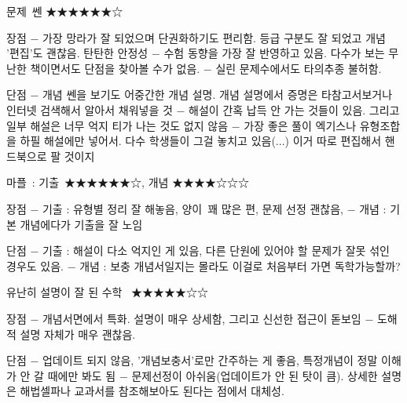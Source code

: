 문제 쎈 ★★★★★★☆
\vspace{5mm}

장점
$-$ 가장 망라가 잘 되었으며 단권화하기도 편리함. 등급 구분도 잘 되었고 개념 '편집'도 괜찮음. 탄탄한 안정성
$-$ 수험 동향을 가장 잘 반영하고 있음. 다수가 보는 무난한 책이면서도 단점을 찾아볼 수가 없음.
$-$ 실린 문제수에서도 타의추종 불허함.
\vspace{5mm}

단점
$-$ 개념 쎈을 보기도 어중간한 개념 설명. 개념 설명에서 증명은 타참고서보거나 인터넷 검색해서 알아서 채워넣을 것
$-$ 해설이 간혹 납득 안 가는 것들이 있음. 그리고 일부 해설은 너무 억지 티가 나는 것도 없지 않음
$-$ 가장 좋은 풀이 엑기스나 유형조합을 하필 해설에만 넣어서. 다수 학생들이 그걸 놓치고 있음(...) 이거 따로 편집해서 핸드북으로 팔 것이지
\vspace{5mm}

마플 : 기출 ★★★★★★☆, 개념 ★★★★☆☆☆
\vspace{5mm}

장점
$-$ 기출 : 유형별 정리 잘 해놓음, 양이 꽤 많은 편, 문제 선정 괜찮음,
$-$ 개념 : 기본 개념에다가 기출을 잘 노임
\vspace{5mm}

단점
$-$ 기출 : 해설이 다소 억지인 게 있음, 다른 단원에 있어야 할 문제가 잘못 섞인 경우도 있음.
$-$ 개념 : 보충 개념서일지는 몰라도 이걸로 처음부터 가면 독학가능할까?
\vspace{5mm}

유난히 설명이 잘 된 수학  ★★★★★☆☆
\vspace{5mm}

장점
$-$ 개념서면에서 특화. 설명이 매우 상세함, 그리고 신선한 접근이 돋보임
$-$ 도해적 설명 자체가 매우 괜찮음.
\vspace{5mm}

단점
$-$ 업데이트 되지 않음, '개념보충서'로만 간주하는 게 좋음, 특정개념이 정말 이해가 안 갈 때에만 봐도 됨
$-$ 문제선정이 아쉬움(업데이트가 안 된 탓이 큼). 상세한 설명은 해법셀파나 교과서를 참조해보아도 된다는 점에서 대체성.
\vspace{5mm}

